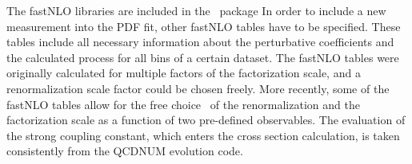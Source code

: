 \begin{description}
\begin{itemize}
The fastNLO libraries are included in the \fitter\ package
In order to include a new measurement into the PDF fit,
other fastNLO tables have to be specified. These tables include all
necessary information about the perturbative coefficients and the
calculated process for all bins of a certain dataset. 
%
The fastNLO tables were originally calculated
for multiple factors of the factorization scale, 
and a renormalization scale factor could be chosen freely.
More recently, some of the fastNLO tables allow for 
the free choice~\cite{Britzger:2012bs} of the renormalization and the factorization
scale as a function of two pre-defined observables.
The evaluation of the strong coupling constant, which enters
the cross section calculation, is taken consistently from the 
QCDNUM evolution code.
\end{itemize}

\end{description}

